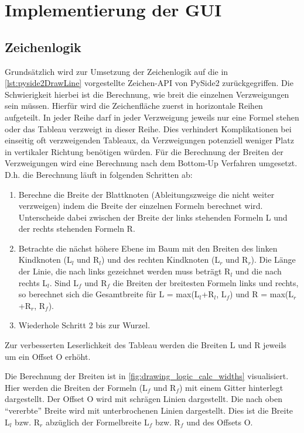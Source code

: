 \section{Implementierung der \ac{GUI}\label{sec:ui_impl}}
\subsection{Zeichenlogik}
Grundsätzlich wird zur Umsetzung der Zeichenlogik auf die in \autoref{lst:pyside2DrawLine} vorgestellte Zeichen-API von PySide2 zurückgegriffen. Die Schwierigkeit hierbei ist die Berechnung, wie breit die einzelnen Verzweigungen sein müssen. Hierfür wird die Zeichenfläche zuerst in horizontale Reihen aufgeteilt. In jeder Reihe darf in jeder Verzweigung jeweils nur eine Formel stehen oder das Tableau verzweigt in dieser Reihe. Dies verhindert Komplikationen bei einseitig oft verzweigenden Tableaux, da Verzweigungen potenziell weniger Platz in vertikaler Richtung benötigen würden. Für die Berechnung der Breiten der Verzweigungen wird eine Berechnung nach dem Bottom-Up Verfahren umgesetzt. D.h. die Berechnung läuft in folgenden Schritten ab:
\begin{enumerate}
\item Berechne die Breite der Blattknoten (Ableitungszweige die nicht weiter verzweigen) indem die Breite der einzelnen Formeln berechnet wird. Unterscheide dabei zwischen der Breite der links stehenden Formeln L und der rechts stehenden Formeln R.

\item Betrachte die nächst höhere Ebene im Baum mit den Breiten des linken Kindknoten (L$_{l}$ und R$_{l}$) und des rechten Kindknoten (L$_{r}$ und R$_{r}$). Die Länge der Linie, die nach links gezeichnet werden muss beträgt R$_{l}$ und die nach rechts L$_{l}$. Sind L$_{f}$ und R$_{f}$ die Breiten der breitesten Formeln links und rechts, so berechnet sich die Gesamtbreite für L = max(L$_{l}$+R$_{l}$, L$_{f}$) und R = max(L$_{r}$+R$_{r}$, R$_{f}$).

\item Wiederhole Schritt 2 bis zur Wurzel.
\end{enumerate}

Zur verbesserten Leserlichkeit des Tableau werden die Breiten L und R jeweils um ein Offset O erhöht.

Die Berechnung der Breiten ist in \autoref{fig:drawing_logic_calc_widths} visualisiert. Hier werden die Breiten der Formeln (L$_{f}$ und R$_{f}$) mit einem Gitter hinterlegt dargestellt. Der Offset O wird mit schrägen Linien dargestellt. Die nach oben ``vererbte'' Breite wird mit unterbrochenen Linien dargestellt. Dies ist die Breite L$_{l}$ bzw. R$_{r}$ abzüglich der Formelbreite L$_{f}$ bzw. R$_{f}$ und des Offsets O.

